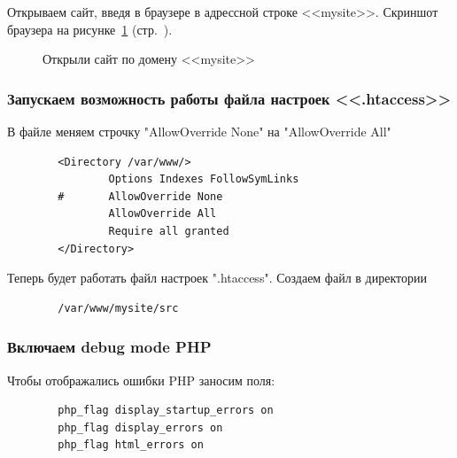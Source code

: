 Открываем сайт, введя в браузере в адрессной строке <<mysite>>.
Скриншот браузера на рисунке~\ref{fig:browser-mysite} (стр.~\pageref{fig:browser-mysite}).

\begin{figure}[tp]
    \caption{Открыли сайт по домену <<mysite>>}
    \label{fig:browser-mysite}
\end{figure}

\newpage


\subsubsection*{Запускаем возможность работы файла настроек <<.htaccess>>}

В файле меняем строчку "AllowOverride None" на "AllowOverride All"

\begin{verbatim}
        <Directory /var/www/>
                Options Indexes FollowSymLinks
        #       AllowOverride None
                AllowOverride All
                Require all granted
        </Directory>
\end{verbatim}

Теперь будет работать файл настроек ".htaccess". Создаем файл в директории

\begin{verbatim}
        /var/www/mysite/src
\end{verbatim}

\subsubsection*{Включаем debug mode PHP}

Чтобы отображались ошибки PHP заносим поля:

\begin{verbatim}
        php_flag display_startup_errors on
        php_flag display_errors on
        php_flag html_errors on
\end{verbatim}

